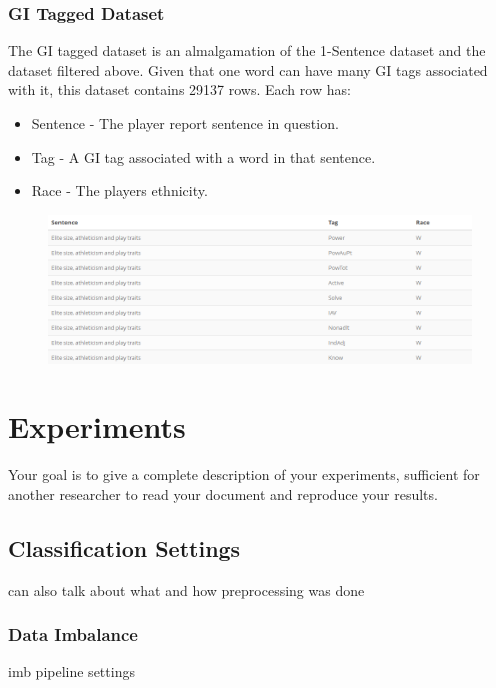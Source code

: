 \documentclass[oneside,12pt]{Classes/RoboticsLaTeX}
\begin{document}
\subsection{GI Tagged Dataset}
The GI tagged dataset is an almalgamation of the 1-Sentence dataset and the dataset filtered above. Given that one word can have many GI tags associated with it, this dataset contains
29137 rows. Each row has:
\begin{itemize}
  \item Sentence - The player report sentence in question.
  \item Tag - A GI tag associated with a word in that sentence.
  \item Race - The players ethnicity.
\end{itemize}

\begin{figure}[ht!b]
  \centering
  \begin{minipage}{1\textwidth}
    \centering
    \includegraphics[width=1\linewidth]{Figures/1_sent_gi_tagged_specific.png}
    \label{fig:1-sentence_gi_tag_example}
  \end{minipage}%
\end{figure}

\chapter{Experiments}
\label{chap:experiments}
Your goal is to give a complete description of your experiments, sufficient for 
another researcher to read your document and reproduce your results.

\section{Classification Settings}
can also talk about what and how preprocessing was done
\subsection{Data Imbalance}
imb pipeline settings
\end{document}
